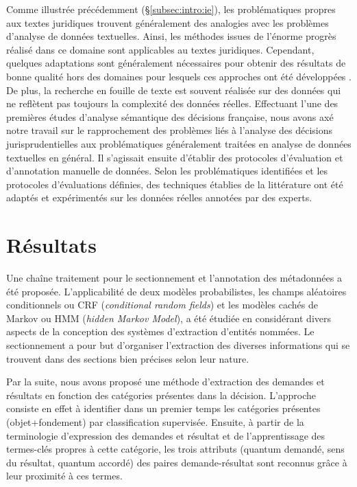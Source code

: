 Comme illustrée précédemment (§\ref{subsec:intro:ie}), les problématiques propres aux textes juridiques trouvent généralement des analogies avec les problèmes d'analyse de données textuelles. Ainsi, les méthodes issues de l'énorme progrès réalisé dans ce domaine sont applicables au textes juridiques. Cependant, quelques adaptations sont généralement nécessaires pour obtenir des résultats de bonne qualité hors des domaines pour lesquels ces approches ont été développées \citep{Waltl2016lexia}. De plus, la recherche en fouille de texte est souvent réalisée sur des données qui ne reflètent pas toujours la complexité des données réelles. Effectuant l'une des premières études d'analyse sémantique des décisions française, nous avons axé notre travail sur le rapprochement des problèmes liés à l'analyse des décisions jurisprudentielles aux problématiques généralement traitées en analyse de données textuelles en général. Il s'agissait ensuite d'établir des protocoles d'évaluation et d'annotation manuelle de données. Selon les problématiques identifiées et les protocoles d'évaluations définies, des techniques établies de la littérature ont été adaptés et expérimentés sur les données réelles annotées par des experts.

\section{Résultats}
\label{sec:intro:résultats}
Une chaîne traitement pour le sectionnement et l'annotation des métadonnées a été proposée. L'applicabilité de deux modèles probabilistes, les champs aléatoires conditionnels ou CRF (\textit{conditional random fields}) et les modèles cachés de Markov ou HMM (\textit{hidden Markov Model}), a été étudiée en considérant divers aspects de la conception des systèmes d'extraction d'entités nommées. Le sectionnement a pour but d'organiser l'extraction des diverses informations qui se trouvent dans des sections bien précises selon leur nature. 

Par la suite, nous avons proposé une méthode d'extraction des demandes et résultats en fonction des catégories présentes dans la décision. L'approche consiste en effet à identifier dans un premier temps les catégories présentes (objet+fondement) par classification supervisée. Ensuite, à partir de la terminologie d'expression des demandes et résultat et de l'apprentissage des termes-clés propres à cette catégorie, les trois attributs (quantum demandé, sens du résultat, quantum accordé) des paires demande-résultat sont reconnus grâce à leur proximité à ces termes. 

